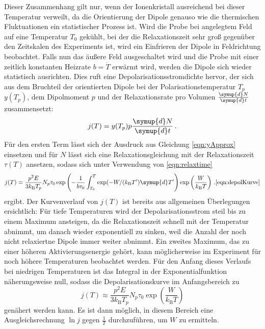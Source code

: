Dieser Zusammenhang gilt nur, wenn der Ionenkristall ausreichend bei dieser Temperatur verweilt, da die Orientierung der Dipole genauso wie die thermischen Fluktuationen ein statistischer Prozess ist. Wird die Probe bei angelegtem Feld auf eine Temperatur  $T_0$ gekühlt, bei der die Relaxationszeit sehr groß gegenüber den Zeitskalen des Experiments ist, wird ein Einfrieren der Dipole in Feldrichtung beobachtet. Falls nun das äußere Feld ausgeschaltet wird und die Probe mit einer zeitlich konstanten Heizrate $b=\dot{T}$ erwärmt wird, werden die Dipole sich wieder statistisch ausrichten. Dies ruft eine Depolarisationsstromdichte hervor, der sich aus dem Bruchteil der orientierten Dipole bei der Polarisationstemperatur $T_p$ $y(T_p)$, dem Dipolmoment $p$ und der Relaxationsrate pro Volumen $\frac{\symup{d}N}{\symup{d}t}$ zusammensetzt:
\begin{equation}
  j(T) = y(T_p) p \frac{\symup{d}N}{\symup{d}t}\,.
  \label{eqn:jAnsatz}
\end{equation}
Für den ersten Term lässt sich der Ausdruck aus Gleichung \eqref{eqn:yApprox} einsetzen und für $N$ lässt sich eine Relaxationsgleichung mit der Relaxationszeit $\tau(T)$ ansetzen, sodass sich unter Verwendung von \eqref{eqn:relaxtime}
\begin{equation}
  j(T) = \frac{p^2 E}{3 k_\text{B} T_p} {N_p}{\tau_0}
         \exp \left(- \frac{1}{b \tau_0} \int_{T_0}^{T} \exp(-W/(k_\text{B}T') \symup{d}T' \right) \exp\left(\frac{W}{k_{\text{B}}T}\right)\,.
  \eqref{eqn:depolKurve}
\end{equation}
ergibt. Der Kurvenverlauf von $j(T)$ ist bereits aus allgemeinen Überlegungen ersichtlich: Für tiefe Temperaturen wird der Depolarisationsstrom steil bis zu einem Maximum ansteigen, da die Relaxationszeit schnell mit der Temperatur abnimmt, um danach wieder exponentiell zu sinken, weil die Anzahl der noch nicht relaxiertne Dipole immer weiter abnimmt. Ein zweites Maximum, das zu einer höheren Aktivierungsenergie gehört, kann möglicherweise im Experiment für noch höhere Temperaturen beobachtet werden.
Für den Anfang dieses Verlaufs bei niedrigen Temperaturen ist das Integral in der Exponentialfunktion näherungsweise null, sodass die Depolarisationskurve im Anfangsbereich zu
\begin{equation}
  j(T) \approx \frac{p^2 E}{3 k_\text{B} T_p} {N_p}{\tau_0}
               \exp\left(\frac{W}{k_{\text{B}}T}\right)
\end{equation}
genähert werden kann. Es ist dann möglich, in diesem Bereich eine Ausgleichsrechnung $\ln j$ gegen $\frac{1}{T}$ durchzuführen, um $W$ zu ermitteln.

